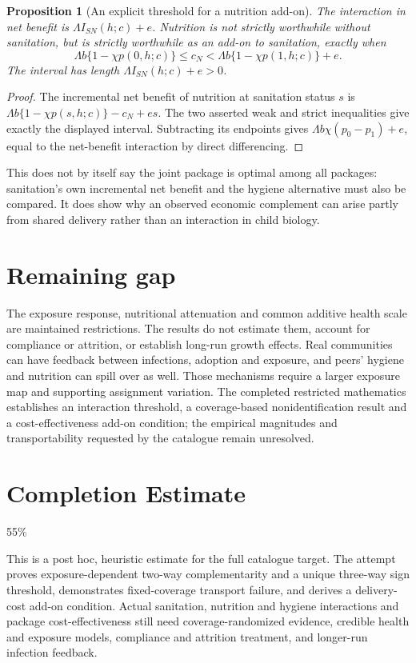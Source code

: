 \documentclass[11pt,a4paper]{article}
\newtheorem{proposition}[theorem]{Proposition}
\theoremstyle{definition}
\theoremstyle{remark}
\begin{document}
\begin{proposition}[An explicit threshold for a nutrition add-on]
The interaction in net benefit is $\Lambda I_{SN}(h;c)+e$. Nutrition is not strictly worthwhile without sanitation, but is strictly worthwhile as an add-on to sanitation, exactly when
\[
 \Lambda b\{1-\chi p(0,h;c)\}\leq c_N
       <\Lambda b\{1-\chi p(1,h;c)\}+e.
\]
The interval has length $\Lambda I_{SN}(h;c)+e>0$.
\end{proposition}
\begin{proof}
The incremental net benefit of nutrition at sanitation status $s$ is
$\Lambda b\{1-\chi p(s,h;c)\}-c_N+es$.
The two asserted weak and strict inequalities give exactly the displayed interval. Subtracting its endpoints gives $\Lambda b\chi(p_0-p_1)+e$, equal to the net-benefit interaction by direct differencing.
\end{proof}

This does not by itself say the joint package is optimal among all packages: sanitation's own incremental net benefit and the hygiene alternative must also be compared. It does show why an observed economic complement can arise partly from shared delivery rather than an interaction in child biology.

\section{Remaining gap}
The exposure response, nutritional attenuation and common additive health scale are maintained restrictions. The results do not estimate them, account for compliance or attrition, or establish long-run growth effects. Real communities can have feedback between infections, adoption and exposure, and peers' hygiene and nutrition can spill over as well. Those mechanisms require a larger exposure map and supporting assignment variation. The completed restricted mathematics establishes an interaction threshold, a coverage-based nonidentification result and a cost-effectiveness add-on condition; the empirical magnitudes and transportability requested by the catalogue remain unresolved.

\section{Completion Estimate}
55\%

This is a post hoc, heuristic estimate for the full catalogue target.
The attempt proves exposure-dependent two-way complementarity and a unique three-way sign threshold, demonstrates fixed-coverage transport failure, and derives a delivery-cost add-on condition. Actual sanitation, nutrition and hygiene interactions and package cost-effectiveness still need coverage-randomized evidence, credible health and exposure models, compliance and attrition treatment, and longer-run infection feedback.
\end{document}
